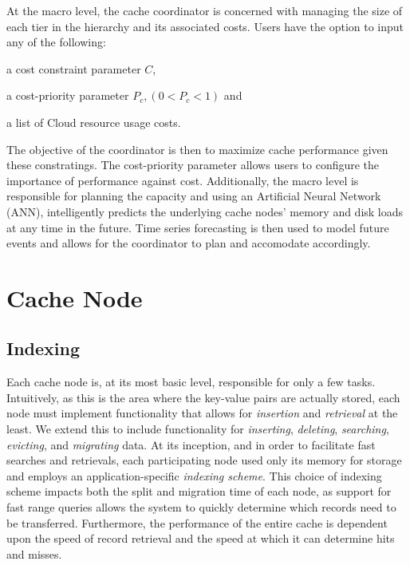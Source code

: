 At the macro level, the cache coordinator is concerned with managing the size
of each tier in the hierarchy and its associated costs. Users have the option
to input any of the following:
\begin{inparaenum}[(1)]
  \item a cost constraint parameter $C$,
  \item a cost-priority parameter $P_c, (0 < P_c < 1)$ and
  \item a list of Cloud resource usage costs.
\end{inparaenum}
The objective of the coordinator is then to maximize cache performance given
these constratings. The cost-priority parameter allows users to configure the
importance of performance against cost. Additionally, the macro level is
responsible for planning the capacity and using an Artificial Neural Network
(ANN), intelligently predicts the underlying cache nodes' memory and disk loads
at any time in the future. Time series forecasting is then used to model future
events and allows for the coordinator to plan and accomodate accordingly.


\section{Cache Node} %
\label{sec:Cache_Node}

\subsection{Indexing}
\label{sub:cache_indexing}
Each cache node is, at its most basic level, responsible for only a few tasks.
Intuitively, as this is the area where the key-value pairs are actually stored,
each node must implement functionality that allows for \emph{insertion} and
\emph{retrieval} at the least. We extend this to include functionality for
\emph{inserting}, \emph{deleting}, \emph{searching}, \emph{evicting}, and
\emph{migrating} data. At its inception, and in order to facilitate fast
searches and retrievals, each participating node used only its memory for
storage and employs an application-specific \emph{indexing scheme}. This choice
of indexing scheme impacts both the split and migration time of each node, as
support for fast range queries allows the system to quickly determine which
records need to be transferred. Furthermore, the performance of the entire
cache is dependent upon the speed of record retrieval and the speed at which it
can determine hits and misses.

